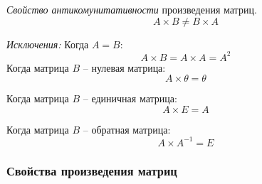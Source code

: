 \textit{Свойство антикомунитативности} произведения матриц. 
\[
  A \times B \neq B \times A
\]

\begin{note}
  \textit{Исключения:} 
  Когда $A = B$:  \[
    A \times B = A \times A = A^2
  \]  
  Когда матрица $B$ -- нулевая матрица:
  \[
    A \times \theta = \theta
  \] 

  Когда матрица  $B$ -- единичная матрица:
  \[
    A \times E = A
  \] 

  Когда матрица $B$ -- обратная матрица:
  \[
    A \times A^{-1} = E
  \] 
\end{note}

\subsubsection{Свойства произведения матриц}

